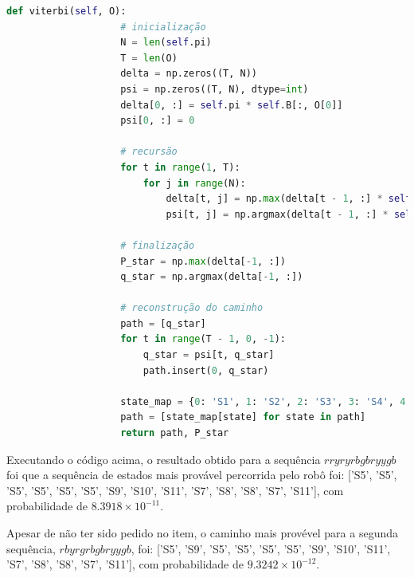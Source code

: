 \begin{itemize}
\begin{tcolorbox}[title=Resposta:]
        \end{tcolorbox}

        \begin{lstlisting}[language=Python, caption={viterbi}, label={lst:viterbi}]
                def viterbi(self, O):
                    # inicialização
                    N = len(self.pi)
                    T = len(O)
                    delta = np.zeros((T, N))
                    psi = np.zeros((T, N), dtype=int)
                    delta[0, :] = self.pi * self.B[:, O[0]]
                    psi[0, :] = 0

                    # recursão
                    for t in range(1, T):
                        for j in range(N):
                            delta[t, j] = np.max(delta[t - 1, :] * self.A[:, j]) * self.B[j, O[t]]
                            psi[t, j] = np.argmax(delta[t - 1, :] * self.A[:, j])
                    
                    # finalização
                    P_star = np.max(delta[-1, :])
                    q_star = np.argmax(delta[-1, :])

                    # reconstrução do caminho
                    path = [q_star]
                    for t in range(T - 1, 0, -1):
                        q_star = psi[t, q_star]
                        path.insert(0, q_star)

                    state_map = {0: 'S1', 1: 'S2', 2: 'S3', 3: 'S4', 4: 'S5', 5: 'S6', 6: 'S7', 7: 'S8', 8: 'S9', 9: 'S10', 10: 'S11', 11: 'S12', 12: 'S13', 13: 'S14', 14: 'S15', 15: 'S16'}
                    path = [state_map[state] for state in path]
                    return path, P_star
        \end{lstlisting}

        \begin{tcolorbox}[title=Resposta (continuação):]
            Executando o código acima, o resultado obtido para a sequência \( r r y r y r b g b r y y g b \) foi que a sequência de estados mais provável percorrida pelo robô foi: ['S5', 'S5', 'S5', 'S5', 'S5', 'S5', 'S9', 'S10', 'S11', 'S7', 'S8', 'S8', 'S7', 'S11'], com probabilidade de $8.3918 \times 10^{-11}$.

            Apesar de não ter sido pedido no item, o caminho mais provével para a segunda sequência, \( r b y r g r b g b r y y g b \), foi: ['S5', 'S9', 'S5', 'S5', 'S5', 'S5', 'S9', 'S10', 'S11', 'S7', 'S8', 'S8', 'S7', 'S11'], com probabilidade de $9.3242 \times 10^{-12}$.
        \end{tcolorbox}
    
\end{itemize}

